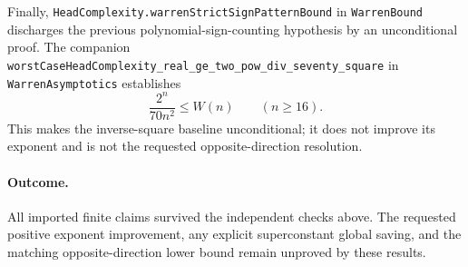 \documentclass[11pt]{article}
\begin{document}
Finally, \texttt{HeadComplexity.warrenStrictSignPatternBound} in
\texttt{WarrenBound} discharges the previous polynomial-sign-counting
hypothesis by an unconditional proof.
The companion
\texttt{worstCaseHeadComplexity\_real\_ge\_two\_pow\_div\_seventy\_square}
in \texttt{WarrenAsymptotics} establishes
\[
 \frac{2^n}{70n^2}\leq W(n)\qquad(n\geq16).
\]
This makes the inverse-square baseline unconditional; it does not
improve its exponent and is not the requested opposite-direction
resolution.

\paragraph{Outcome.}
All imported finite claims survived the independent checks above.
The requested positive exponent improvement, any explicit superconstant
global saving, and the matching opposite-direction lower bound remain
unproved by these results.
\end{document}

